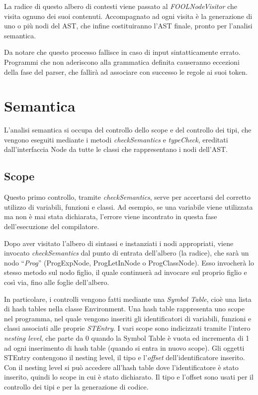 \documentclass{scrreprt}
\begin{document}
La radice di questo albero di contesti viene passato al \textit{FOOLNodeVisitor} che visita ognuno dei suoi 
contenuti. Accompagnato ad ogni visita è la generazione di uno o più nodi del AST, che infine 
costituiranno l’AST finale, pronto per l’analisi semantica.

Da notare che questo processo fallisce in caso di input sintatticamente errato. Programmi 
che non aderiscono alla grammatica definita causeranno eccezioni della fase
del parser, che fallirà ad associare con successo le regole ai suoi token. 

\chapter{Semantica}
L'analisi semantica si occupa del controllo dello scope e del controllo dei tipi, che vengono eseguiti mediante i metodi \textit{checkSemantics} e \textit{typeCheck}, 
ereditati dall'interfaccia Node da tutte le classi che rappresentano i nodi dell'AST.

\section{Scope}
Questo primo controllo, tramite \textit{checkSemantics}, serve per accertarsi del corretto utilizzo di variabili, funzioni e classi. Ad esempio, se una variabile viene utilizzata
ma non è mai stata dichiarata, l'errore viene incontrato in questa fase dell'esecuzione del compilatore. 

Dopo aver visitato l'albero di sintassi e instanziati i nodi appropriati, 
viene invocato \textit{checkSemantics} dal punto di entrata dell'albero (la radice), che sarà un nodo ``\textit{Prog}'' (ProgExpNode, ProgLetInNode o ProgClassNode). 
Esso invocherà lo stesso metodo sul nodo figlio, il quale continuerà ad invocare sul proprio figlio e così via, fino alle foglie dell'albero.

In particolare, i controlli vengono fatti mediante una \textit{Symbol Table}, cioè una lista di hash tables nella classe Environment. Una hash table rappresenta uno scope nel programma,
nel quale vengono inseriti gli identificatori di variabili, funzioni e classi associati alle proprie \textit{STEntry}. I vari scope sono indicizzati tramite l'intero \textit{nesting level}, che parte da 0 quando 
la Symbol Table è vuota ed incrementa di 1 ad ogni inserimento di hash table (quando si entra in nuovo scope). Gli oggetti STEntry contengono il nesting level, il tipo e l'\textit{offset}
dell'identificatore inserito. Con il nesting level si può accedere all'hash table dove l'identificatore è stato inserito, quindi lo scope in cui è stato dichiarato. Il tipo e l'offset sono usati
per il controllo dei tipi e per la generazione di codice. 
\end{document}
